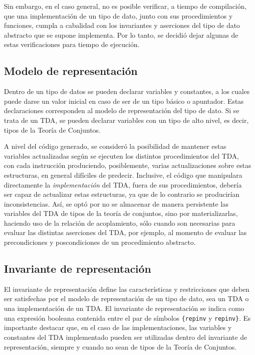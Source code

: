 Sin embargo, en el caso general, no es posible verificar, a tiempo de
compilación, que una implementación de un tipo de dato, junto con sus
procedimientos y funciones, cumpla a cabalidad con los invariantes y aserciones
del tipo de dato abstracto que se supone implementa. Por lo tanto, se decidió
dejar algunas de estas verificaciones para tiempo de ejecución.

\subsection{Modelo de representación}

Dentro de un tipo de datos se pueden declarar variables y constantes, a los
cuales puede darse un valor inicial en caso de ser de un tipo básico o
apuntador. Estas declaraciones corresponden al modelo de representación del tipo
de dato. Si se trata de un TDA, se pueden declarar variables con un tipo de alto
nivel, es decir, tipos de la Teoría de Conjuntos.

A nivel del código generado, se consideró la posibilidad de mantener estas
variables actualizadas según se ejecuten los distintos procedimientos del TDA,
con cada instrucción produciendo, posiblemente, varias actualizaciones sobre
estas estructuras, en general difíciles de predecir. Inclusive, el código que
manipulara directamente la \textit{implementación} del TDA, fuera de sus
procedimientos, debería ser capaz de actualizar estas estructuras, ya que de lo
contrario se producirían inconsistencias. Así, se optó por no se almacenar de
manera persistente las variables del TDA de tipos de la teoría de conjuntos,
sino por materializarlas, haciendo uso de la relación de acoplamiento, sólo
cuando son necesarias para evaluar las distintas aserciones del TDA, por
ejemplo, al momento de evaluar las precondiciones y poscondiciones de un
procedimiento abstracto.

\subsection{Invariante de representación}

El invariante de representación define las características y restricciones que
deben ser satisfechas por el modelo de representación de un tipo de dato, sea un
TDA o una implementación de un TDA. El invariante de representación se indica
como una expresión booleana contenida entre el par de símbolos \texttt{\{repinv}
y \texttt{repinv\}}. Es importante destacar que, en el caso de las
implementaciones, las variables y constantes del TDA implementado pueden ser
utilizadas dentro del invariante de representación, siempre y cuando no sean de
tipos de la Teoría de Conjuntos.

